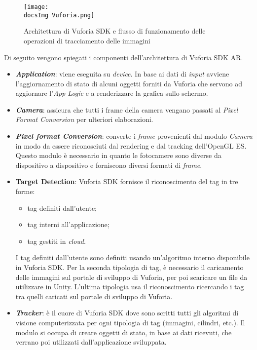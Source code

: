 \begin{figure}[H]
	\centering
	\texttt{[image: \\docsImg Vuforia.png]}
	\caption{Architettura di Vuforia SDK e flusso di funzionamento delle operazioni di tracciamento delle immagini}
	\label{fig:Architettura di Vuforia SDK e flusso di funzionamento delle operazioni di tracciamento delle immagini
	}
\end{figure}

Di seguito vengono spiegati i componenti dell'architettura di Vuforia SDK AR.

\begin{itemize}
	\item \textbf{\textit{Application}}: viene eseguita su \textit{device}. In base ai dati di \textit{input} avviene l'aggiornamento di stato di alcuni oggetti forniti da Vuforia che servono ad aggiornare l'\textit{App Logic} e a renderizzare la grafica sullo schermo.
	\item  \textbf{\textit{Camera}}: assicura che tutti i frame della camera vengano passati al \textit{Pixel Format Conversion} per ulteriori elaborazioni.
	\item \textbf{\textit{Pixel format Conversion}}: converte i \textit{frame} provenienti dal modulo \textit{Camera} in modo da essere riconosciuti dal rendering e dal tracking dell'OpenGL ES. Questo modulo \`e necessario in quanto le fotocamere sono diverse da dispositivo a dispositivo e forniscono diversi formati di \textit{frame}.
	\item \textbf{Target Detection}: Vuforia SDK fornisce il riconoscimento del tag in tre forme:
	\begin{itemize}
		\item tag definiti dall'utente;
		\item tag interni all'applicazione;
		\item tag gestiti in \textit{cloud}.
	\end{itemize} 
	I tag definiti dall'utente sono definiti usando un'algoritmo interno disponibile in Vuforia SDK. Per la seconda tipologia di tag, \`e necessario il caricamento delle immagini sul portale di sviluppo di Vuforia, per poi scaricare un file da utilizzare in Unity. L'ultima tipologia usa il riconoscimento ricercando i tag tra quelli caricati sul portale di sviluppo di Vuforia.
	\item \textbf{\textit{Tracker}}: \`e il cuore di Vuforia SDK dove sono scritti tutti gli algoritmi di visione computerizzata per ogni tipologia di tag (immagini, cilindri, etc.). Il modulo si occupa di creare oggetti di stato, in base ai dati ricevuti, che verrano poi utilizzati dall'applicazione sviluppata.
\end{itemize}



